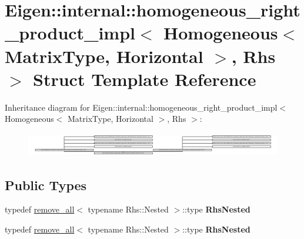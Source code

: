 \hypertarget{struct_eigen_1_1internal_1_1homogeneous__right__product__impl_3_01_homogeneous_3_01_matrix_type_ef182dac64ca84d6bf223cfad456dbfc}{}\section{Eigen\+:\+:internal\+:\+:homogeneous\+\_\+right\+\_\+product\+\_\+impl$<$ Homogeneous$<$ Matrix\+Type, Horizontal $>$, Rhs $>$ Struct Template Reference}
\label{struct_eigen_1_1internal_1_1homogeneous__right__product__impl_3_01_homogeneous_3_01_matrix_type_ef182dac64ca84d6bf223cfad456dbfc}
Inheritance diagram for Eigen\+:\+:internal\+:\+:homogeneous\+\_\+right\+\_\+product\+\_\+impl$<$ Homogeneous$<$ Matrix\+Type, Horizontal $>$, Rhs $>$\+:\begin{figure}[H]
\begin{center}
\leavevmode
\includegraphics[height=1.050000cm]{struct_eigen_1_1internal_1_1homogeneous__right__product__impl_3_01_homogeneous_3_01_matrix_type_ef182dac64ca84d6bf223cfad456dbfc}
\end{center}
\end{figure}
\subsection*{Public Types}
\begin{DoxyCompactItemize}
\item 
\mbox{\label{struct_eigen_1_1internal_1_1homogeneous__right__product__impl_3_01_homogeneous_3_01_matrix_type_ef182dac64ca84d6bf223cfad456dbfc_acc95ace7a9e4099584f34079c3de462a}} 
typedef \hyperlink{struct_eigen_1_1internal_1_1remove__all}{remove\+\_\+all}$<$ typename Rhs\+::\+Nested $>$\+::type {\bfseries Rhs\+Nested}
\item 
\mbox{\label{struct_eigen_1_1internal_1_1homogeneous__right__product__impl_3_01_homogeneous_3_01_matrix_type_ef182dac64ca84d6bf223cfad456dbfc_acc95ace7a9e4099584f34079c3de462a}} 
typedef \hyperlink{struct_eigen_1_1internal_1_1remove__all}{remove\+\_\+all}$<$ typename Rhs\+::\+Nested $>$\+::type {\bfseries Rhs\+Nested}
\end{DoxyCompactItemize}
